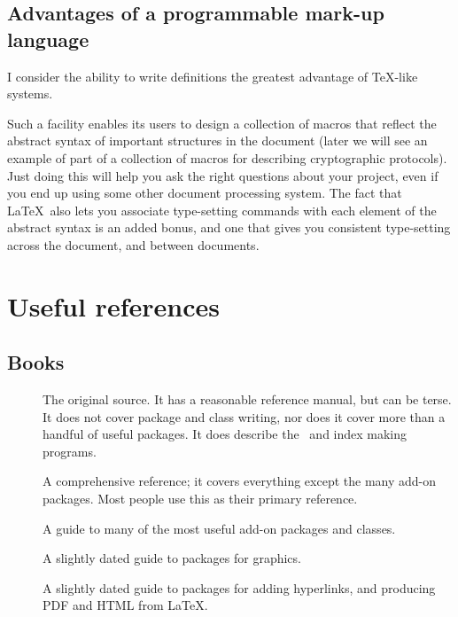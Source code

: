 \documentclass[authoryearcitations]{UoYCSproject}
\begin{document}
\section{Advantages of a programmable mark-up language}
\label{sec:advantagesofprogrammable}

I consider the ability to write definitions the greatest advantage of
\TeX-like systems.

Such a facility enables its users to design a collection of macros
that reflect the abstract syntax of important structures in the
document (later we will see an example of part of a collection of
macros for describing cryptographic protocols).  Just doing this will
help you ask the right questions about your project, even if you end
up using some other document processing system.  The fact that \LaTeX\ 
also lets you associate type-setting commands with each element of the
abstract syntax is an added bonus, and one that gives you consistent
type-setting across the document, and between documents.

\cleardoublepage
\chapter{Useful references}
\label{cha:usefulrefs}


\section{Books}
\label{sec:books}

\begin{description}
\item[\citet{Lamport1994}] The original source.  It has a reasonable
  reference manual, but can be terse.  It does not cover package and
  class writing, nor does it cover more than a handful of useful
  packages.  It does describe the \BibTeX\ and index making programs.
\item[\citet{KopkaDaly1999}] A comprehensive reference; it covers
  everything except the many add-on packages.  Most people use this as
  their primary reference.
\item[\citet{MittelbachGoossensBraamsCarlisleRowley2004}] A guide to
  many of the most useful add-on packages and classes.
\item[\citet{GoosensRahtzMittelbach1997}] A slightly dated guide to
  packages for graphics.
\item[\citet{GoosensRahtzGurariMooreSutor1999}] A slightly dated guide
  to packages for adding hyperlinks, and producing PDF and HTML from
  \LaTeX.
\end{description}
\end{document}
